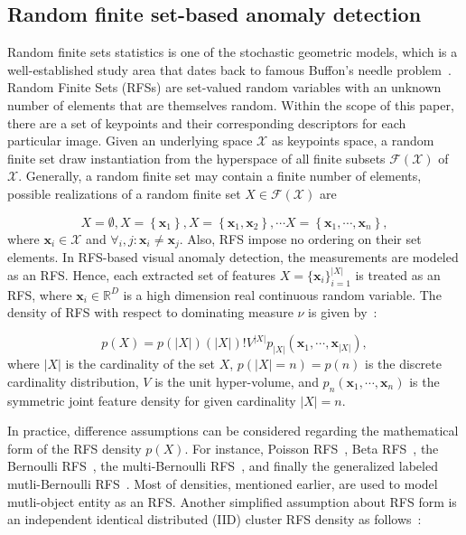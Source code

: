 \documentclass[journal]{IEEEtran}
\begin{document}
\subsection{Random finite set-based anomaly detection}

Random finite sets statistics is one of the stochastic geometric models, which is a well-established study area that dates back to famous Buffon's needle problem~\cite{chiu2013stochastic}. Random Finite Sets (RFSs) are set-valued random variables with an unknown number of elements that are themselves random. Within the scope of this paper, there are a set of keypoints and their corresponding descriptors for each particular image. Given an underlying space $\mathcal{X}$ as keypoints space, a random finite set draw instantiation from the hyperspace of all finite subsets $\mathcal{F(X)}$ of $\mathcal{X}$. Generally, a random finite set may contain a finite number of elements, possible realizations of a random finite set $X \in \mathcal{F(X)}$ are

\begin{equation}
X=\emptyset,X= \left\lbrace \mathbf{x}_1 \right\rbrace ,X=\left\lbrace \mathbf{x}_1,\mathbf{x}_2 \right\rbrace ,\cdots X=\left\lbrace \mathbf{x}_1,\cdots, \mathbf{x}_n \right\rbrace , 
\end{equation}
where $\mathbf{x}_i \in \mathcal{X}$ and $\forall_i,j:\mathbf{x}_i\neq \mathbf{x}_j$. Also, RFS impose no ordering on their set elements. In RFS-based visual anomaly detection, the measurements are modeled as an RFS. Hence, each extracted set of features $X=\{ \mathbf{x}_i\}_{i=1}^{|X|}$ is treated as an RFS, where $\mathbf{x}_i \in \mathbb{R}^D$ is a high dimension real continuous random variable. The density of RFS with respect to dominating measure $\nu$ is given by~\cite{vo2018model}:

\begin{equation}
p(X)=p(|X|)(|X|)!V^{|X|} p_{|X|}( \mathbf{x}_1,\cdots,\mathbf{x}_{|X|}),
\end{equation}
where $|X|$ is the cardinality of the set $X$, $p(|X|=n)=p(n)$ is the discrete cardinality distribution, $V$ is the unit hyper-volume, and $p_{n}( \mathbf{x}_1,\cdots,\mathbf{x}_{n})$ is the symmetric joint feature density for given cardinality $|X|=n$.

In practice, difference assumptions can be considered regarding the mathematical form of the RFS density $p(X)$. For instance, Poisson RFS~\cite{1261119Mahler}, Beta RFS~\cite{Kamoona9074564}, the Bernoulli RFS~\cite{mahler2007statistical}, the multi-Bernoulli RFS~\cite{vo2008cardinality}, and finally the generalized labeled mutli-Bernoulli RFS~\cite{papi2015generalized}. Most of densities, mentioned earlier, are used to model mutli-object entity as an RFS. Another simplified assumption about RFS form is an independent identical distributed (IID) cluster RFS density as follows~\cite{Vo2018,kamoona2019random}:
\end{document}
